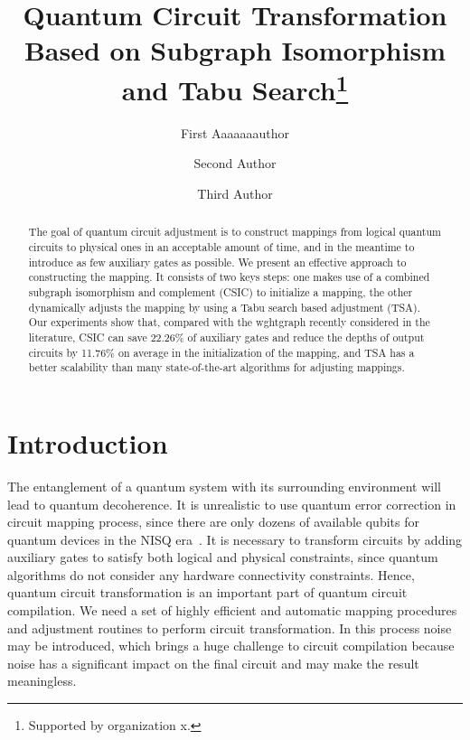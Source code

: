 \documentclass[runningheads]{llncs}
\begin{document}
%
\title{ Quantum Circuit Transformation Based on Subgraph Isomorphism and Tabu Search\thanks{Supported by organization x.}}

\author{First Aaaaaaauthor \and
Second Author \and
Third Author}
%

%
\maketitle              %
%
\begin{abstract}
	The goal of quantum circuit adjustment is to construct mappings from logical quantum circuits to physical ones in an acceptable amount of time, and in the meantime to introduce  as few auxiliary gates as possible. We present an effective approach to constructing the mapping. It consists of two keys steps: one makes use of a combined subgraph isomorphism and complement (CSIC) to initialize a mapping, the other dynamically adjusts the mapping by using a Tabu search based adjustment (TSA). Our experiments show that, compared with the wghtgraph recently considered in the literature, CSIC can save 22.26\% of auxiliary gates and reduce the depths of output circuits by 11.76\% on average in the initialization of the mapping, and  TSA has a better scalability than many state-of-the-art algorithms for adjusting mappings.
	
	
\end{abstract}

\section{Introduction}
\label{Introduction}
The entanglement of a quantum system with its surrounding environment will lead to quantum decoherence. It is unrealistic to use quantum error correction in circuit mapping process, since there are only dozens of available qubits for quantum devices in the NISQ era~\cite{2018QuantumPreskill}. It is necessary to transform circuits by adding auxiliary gates to satisfy both logical and physical constraints, since quantum algorithms do not consider any hardware connectivity constraints. Hence, quantum circuit transformation is an important part of quantum circuit compilation. We need a set of highly efficient and automatic mapping procedures and adjustment routines to perform circuit transformation. In this process noise may be introduced, which brings a huge challenge to circuit compilation because noise has a significant impact on the final circuit and may make the result meaningless. 
\end{document}
